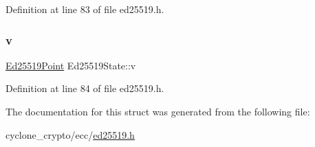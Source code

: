 Definition at line 83 of file ed25519.\+h.

\mbox{\label{structEd25519State_af078cf4ff8905b1a63935a6298c9ccbe}} 
\subsubsection{\texorpdfstring{v}{v}}
{\footnotesize\ttfamily \hyperlink{structEd25519Point}{Ed25519\+Point} Ed25519\+State\+::v}



Definition at line 84 of file ed25519.\+h.



The documentation for this struct was generated from the following file\+:\begin{DoxyCompactItemize}
\item 
cyclone\+\_\+crypto/ecc/\hyperlink{ed25519_8h}{ed25519.\+h}\end{DoxyCompactItemize}
